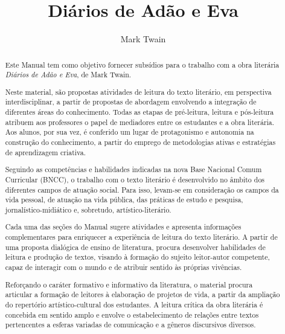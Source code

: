 \documentclass{extarticle}
\begin{document}
\newcommand{\AutorLivro}{Mark Twain}
\newcommand{\TituloLivro}{Diários de Adão e Eva}
\newcommand{\Tema}{Ficção, mistério e fantasia}
\newcommand{\Genero}{Conto, crônica e novela}
\newcommand{\imagemCapa}{./images/PNLD0043-01.png}
\newcommand{\issnppub}{---}
\newcommand{\issnepub}{---}
\newcommand{\colaborador}{\textbf{Michelle Etienne Florence, Bruno Gradella e Vicente Castro} é uma pessoa incrível e vai fazer um bom serviço.}


\title{\TituloLivro}
\author{\AutorLivro}
\def\authornotes{\colaborador}

\date{}
\maketitle

\begin{abstract}
Este Manual tem como objetivo fornecer subsídios para o trabalho com a
obra literária \emph{Diários de Adão e Eva}, de Mark Twain.

Neste material, são propostas atividades de leitura do texto literário,
em perspectiva interdisciplinar, a partir de propostas de abordagem
envolvendo a integração de diferentes áreas do conhecimento. Todas as
etapas de pré-leitura, leitura e pós-leitura atribuem aos professores o
papel de mediadores entre os estudantes e a obra literária. Aos alunos,
por sua vez, é conferido um lugar de protagonismo e autonomia na
construção do conhecimento, a partir do emprego de metodologias ativas e
estratégias de aprendizagem criativa.

Seguindo as competências e habilidades indicadas na nova Base Nacional
Comum Curricular (BNCC), o trabalho com o texto literário é desenvolvido
no âmbito dos diferentes campos de atuação social. Para isso, levam-se
em consideração os campos da vida pessoal, de atuação na vida pública,
das práticas de estudo e pesquisa, jornalístico-midiático e, sobretudo,
artístico-literário.

Cada uma das seções do Manual sugere atividades e apresenta informações
complementares para enriquecer a experiência de leitura do texto
literário. A partir de uma proposta dialógica de ensino de literatura,
procura desenvolver habilidades de leitura e produção de textos, visando
à formação do sujeito leitor-autor competente, capaz de interagir com o
mundo e de atribuir sentido às próprias vivências.

Reforçando o caráter formativo e informativo da literatura, o material
procura articular a formação de leitores à elaboração de projetos de
vida, a partir da ampliação do repertório artístico-cultural dos
estudantes. A leitura crítica da obra literária é concebida em sentido
amplo e envolve o estabelecimento de relações entre textos pertencentes
a esferas variadas de comunicação e a gêneros discursivos diversos.


\end{abstract}
\end{document}
